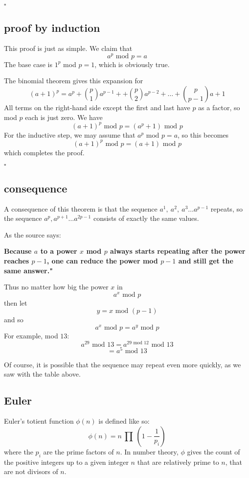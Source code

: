 \documentclass[11pt, oneside]{article}
\begin{document}
$\square$

\subsection*{proof by induction}

This proof is just as simple.  We claim that
\[ a^p  \text{ mod } p = a \]
The base case is $1^p$ mod $p = 1$, which is obviously true.  

The binomial theorem gives this expansion for 
\[  (a+1)^p = a^p + \binom{p}{1} a^{p-1} + + \binom{p}{2} a^{p-2} + \dots + \binom{p}{p-1} a + 1  \]
All terms on the right-hand side except the first and last have $p$ as a factor, so mod $p$ each is just zero.  We have
\[  (a+1)^p \text{ mod } p = (a^p + 1)  \text{ mod } p \]
For the inductive step, we may assume that $a^p  \text{ mod } p = a$, so this becomes
\[ (a+1)^p \text{ mod } p= (a + 1) \text{ mod } p \]
which completes the proof.

$\square$

\subsection*{consequence}
A consequence of this theorem is that the sequence $a^1, \ a^2, \ a^3 \dots a^{p-1}$ repeats, so the sequence $a^{p}, a^{p+1} \dots a^{2p - 1}$ consists of exactly the same values.

As the source says:

\textbf{Because $a$  to a power $x$ mod $p$ always starts repeating after the power reaches $p-1$, one can reduce the power mod $p-1$ and still get the same answer."}

Thus no matter how big the power $x$ in
\[ a^x \text{ mod } p \]
then let
\[ y = x \text{ mod } (p-1) \]
and so
\[ a^x \text{ mod } p = a^{y} \text{ mod } p \]
For example, mod $13$:
\[ a^{29} \text{ mod } 13 = a^{29 \text{ mod } 12} \text{ mod } 13 \]
\[ = a^5  \text{ mod } 13 \]

Of course, it is possible that the sequence may repeat even more quickly, as we saw with the table above.

\subsection*{Euler}
Euler's totient function $\phi(n)$ is defined like so:
\[ \phi(n) = n \ \prod \ (1 - \frac{1}{p_i}) \]
where the $p_i$ are the prime factors of $n$.  In number theory, $\phi$ gives the count of the positive integers up to a given integer $n$ that are relatively prime to $n$, that are not divisors of $n$.
\end{document}
